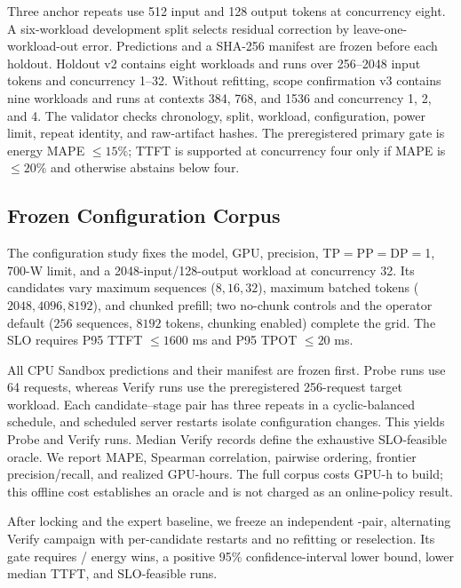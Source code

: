 Three anchor repeats use 512 input and 128 output tokens at concurrency eight.
A six-workload development split selects residual correction by
leave-one-workload-out error.  Predictions and a SHA-256 manifest are frozen
before each holdout.  Holdout v2 contains eight workloads and
\HoldoutMeasurements{} runs over 256--2048 input tokens and concurrency 1--32.
Without refitting, scope confirmation v3 contains nine workloads and
\ConfirmationMeasurements{} runs at contexts 384, 768, and 1536 and concurrency
1, 2, and 4.  The validator checks chronology, split, workload, configuration,
power limit, repeat identity, and raw-artifact hashes.  The preregistered primary
gate is energy MAPE $\leq15\%$; TTFT is supported at concurrency four only if
MAPE is $\leq20\%$ and otherwise abstains below four.

\subsection{Frozen Configuration Corpus}

The configuration study fixes the model, GPU, precision, TP$=$PP$=$DP$=$1, 700-W
limit, and a 2048-input/128-output workload at concurrency 32.  Its
\ConfigurationCandidates{} candidates vary maximum sequences
($8,16,32$), maximum batched tokens ($2048,4096,8192$), and chunked prefill;
two no-chunk controls and the operator default
($256$ sequences, $8192$ tokens, chunking enabled) complete the grid.  The SLO
requires P95 TTFT $\leq1600$ ms and P95 TPOT $\leq20$ ms.

All CPU Sandbox predictions and their manifest are frozen first.  Probe runs
use 64 requests, whereas Verify runs use the preregistered 256-request target
workload.
Each candidate--stage pair has three repeats in a cyclic-balanced schedule, and
scheduled server restarts isolate configuration changes.  This yields
\ConfigurationLoneRuns{} Probe and \ConfigurationLfourRuns{} Verify runs.
Median Verify records define the exhaustive SLO-feasible oracle.  We report
MAPE, Spearman
correlation, pairwise ordering, frontier precision/recall, and realized
GPU-hours.  The full corpus costs \ConfigurationTotalGPUHours{} GPU-h to build;
this offline cost establishes an oracle and is not charged as an online-policy
result.

After locking \VerifiedParetoConfig{} and the expert baseline, we freeze an
independent \WinnerConfirmationPairs{}-pair, alternating Verify campaign with
per-candidate restarts and no refitting or reselection.  Its gate requires
\WinnerConfirmationPairs{}/\WinnerConfirmationPairs{} energy wins, a positive
95\% confidence-interval lower bound, lower median TTFT, and SLO-feasible runs.

